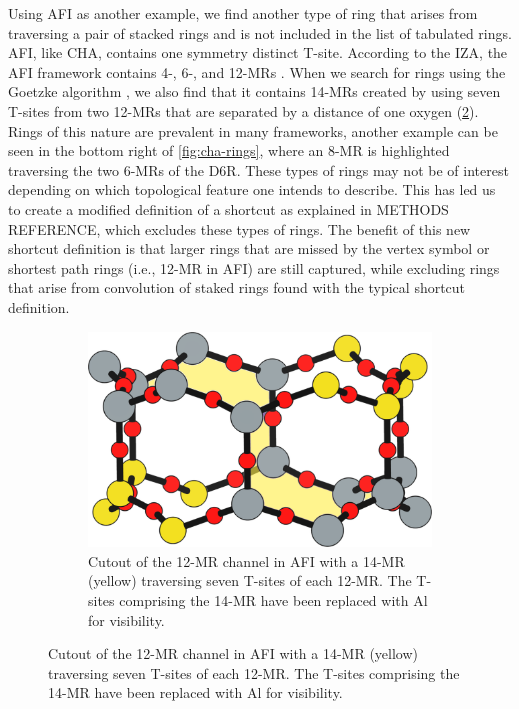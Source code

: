 \documentclass[preprint,numrefs,noinfo,sort&compress]{elsarticle}
\begin{document}
Using AFI as another example, we find another type of ring that arises from traversing a pair of stacked rings and is not included in the list of tabulated rings. AFI, like CHA, contains one symmetry distinct T-site. According to the IZA, the AFI framework contains 4-, 6-, and 12-MRs \cite{baerlocher-database-nodate}. When we search for rings using the Goetzke algorithm \cite{goetzke-properties-1991}, we also find that it contains 14-MRs created by using seven T-sites from two 12-MRs that are separated by a distance of one oxygen (\cref{fig:afi-14}). Rings of this nature are prevalent in many frameworks, another example can be seen in the bottom right of \cref{fig:cha-rings}, where an 8-MR is highlighted traversing the two 6-MRs of the D6R. These types of rings may not be of interest depending on which topological feature one intends to describe. This has led us to create a modified definition of a shortcut as explained in METHODS REFERENCE, which excludes these types of rings. The benefit of this new shortcut definition is that larger rings that are missed by the vertex symbol or shortest path rings (i.e., 12-MR in AFI) are still captured, while excluding rings that arise from convolution of staked rings found with the typical shortcut definition.

\begin{figure}
\begin{figure}[H]
\centering
\includegraphics[width=\textwidth]{figures/chapter-3/afi-14.pdf}
\caption{Cutout of the 12-MR channel in AFI with a 14-MR (yellow) traversing seven T-sites of each 12-MR. The T-sites comprising the 14-MR have been replaced with Al for visibility. \label{fig:afi-14}}
\end{figure}
\end{figure}
\end{document}
